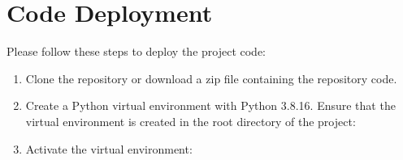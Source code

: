 \documentclass[11pt, a4paper]{report}
\begin{document}
\section{Code Deployment}\label{apdx:2.2}
Please follow these steps to deploy the project code:
\begin{enumerate}
    \item Clone the repository or download a zip file containing the repository code.
    \item Create a Python virtual environment with Python 3.8.16. Ensure that the virtual environment is created in the root directory of the project:
    \item Activate the virtual environment:
    
    
\end{enumerate}
\end{document}
